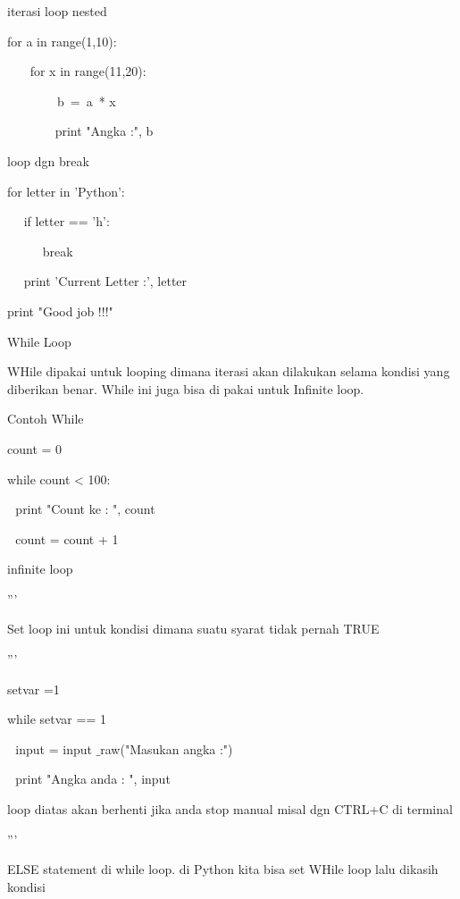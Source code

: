 \vspace{12pt}
iterasi loop nested \par
for a in range(1,10): \par
~~~ for x in range(11,20): \par
~~~~~~~~b~=~a~* x      \par
~~~~~~~ print "Angka :", b \par
\vspace{12pt}
loop dgn break \par
for letter in 'Python': \par
~~ if letter == 'h': \par
~~~~~ break \par
~~ print 'Current Letter :', letter \par
\vspace{12pt}
print "Good job !!!" \par
\vspace{12pt}
While Loop \par
WHile dipakai untuk looping dimana iterasi akan dilakukan selama kondisi yang diberikan benar. While ini juga bisa di pakai untuk Infinite loop. \par
\vspace{12pt}
Contoh While \par
count = 0 \par
while count < 100: \par
 $  $  $  $  $  $print "Count ke : ", count \par
 $  $  $  $  $  $count = count + 1 \par
\vspace{12pt}
infinite loop \par
''' \par
Set loop ini untuk kondisi dimana suatu syarat tidak pernah TRUE \par
''' \par
\vspace{12pt}
setvar =1 \par
while setvar == 1 \par
 $  $  $  $ input = input $  \_  $raw("Masukan angka :") \par
 $  $  $  $ print "Angka anda : ", input \par
\vspace{12pt}
loop diatas akan berhenti jika anda stop manual misal dgn CTRL+C di terminal \par
''' \par
ELSE statement di while loop. di Python kita bisa set WHile loop lalu dikasih kondisi \par
